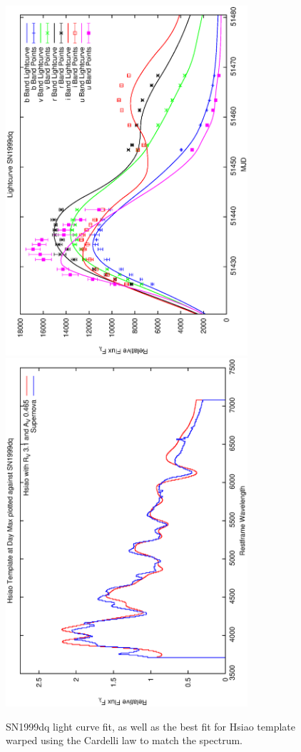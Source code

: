 \clearpage

\begin{figure}[p]
\centering
\includegraphics[angle=-90,width=0.8\textwidth]{./figures/ltcv/SN1999dq_v023_lightcurve.ps}
\hfill
\includegraphics[angle=-90,width=0.8\textwidth]{./figures/hsiao/SN1999dq_v001_hsiao.ps}
\hfill
\caption{SN1999dq light curve fit, as well as the best fit for Hsiao template warped using the Cardelli law to match the spectrum.}
\label{fig:SN1999dqfour2}
\end{figure}

